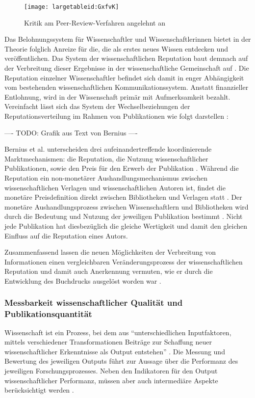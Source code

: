 \begin{figure}[h!]
\texttt{[image: largetableid:GxfvK]}
\caption{Kritik am Peer-Review-Verfahren angelehnt an \cite{mueller_2009_peerreview}}
\end{figure}

Das Belohnungssystem für Wissenschaftler und Wissenschaftlerinnen bietet in der Theorie folglich Anreize für die, die als erstes neues Wissen entdecken und veröffentlichen. Das System der wissenschaftlichen Reputation baut demnach auf der Verbreitung dieser Ergebnisse in der wissenschaftliche Gemeinschaft auf \cite{Fabrizio_2008}. Die Reputation einzelner Wissenschaftler befindet sich damit in enger Abhängigkeit vom bestehenden wissenschaftlichen Kommunikationssystem. Anstatt finanzieller Entlohnung, wird in der Wissenschaft primär mit Aufmerksamkeit bezahlt. Vereinfacht lässt sich das System der Wechselbeziehungen der Reputationsverteilung im Rahmen von Publikationen wie folgt darstellen \cite{cite:21a}:

---- TODO: Grafik aus Text von Bernius ----

Bernius et al. unterscheiden drei aufeinandertreffende koordinierende Marktmechanismen: die Reputation, die Nutzung wissenschaftlicher Publikationen, sowie den Preis für den Erwerb der Publikation \cite{cite:21a}. Während die Reputation ein non-monetärer Aushandlungsmechanismus zwischen wissenschaftlichen Verlagen und wissenschaftlichen Autoren ist, findet die monetäre Preisdefinition direkt zwischen Bibliotheken und Verlagen statt \cite{EuropeanCommission_sciencepub_2006}. Der monetäre Aushandlungsprozess zwischen Wissenschaftlern und Bibliotheken wird durch die Bedeutung und Nutzung der jeweiligen Publikation bestimmt \cite{cite:21a}. Nicht jede Publikation hat diesbezüglich die gleiche Wertigkeit \cite{suchen} und damit den gleichen Einfluss auf die Reputation eines Autors.

Zusammenfassend lassen die neuen Möglichkeiten der Verbreitung von Informationen einen vergleichbaren Veränderungsprozess der wissenschaftlichen Reputation und damit auch Anerkennung vermuten, wie er durch die Entwicklung des Buchdrucks ausgelöst worden war \cite{hanekop_2006}.

\subsubsection{Messbarkeit wissenschaftlicher Qualität und Publikationsquantität}

Wissenschaft ist ein Prozess, bei dem aus “unterschiedlichen Inputfaktoren, mittels verschiedener Transformationen Beiträge zur Schaffung neuer wissenschaftlicher Erkenntnisse als Output entstehen” \cite{Jansen_2007}. Die Messung und Bewertung des jeweiligen Outputs führt zur Aussage über die Performanz des jeweiligen Forschungsprozesses. Neben den Indikatoren für den Output wissenschaftlicher Performanz, müssen aber auch intermediäre Aspekte berücksichtigt werden \cite{schmoch_2009}.

